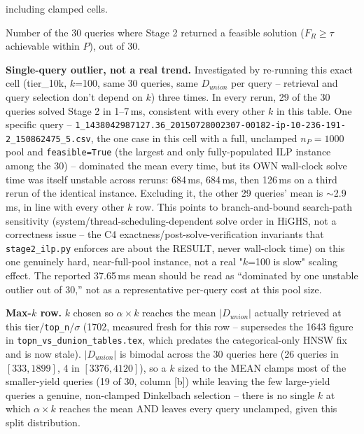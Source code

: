 \begin{table}[t]
\begin{threeparttable}
\begin{tablenotes}
  including clamped cells.
\item[d] Number of the 30 queries where Stage 2 returned a feasible solution ($F_R \geq \tau$
  achievable within $P$), out of 30.
\item[e] \textbf{Single-query outlier, not a real trend.} Investigated by re-running this exact
  cell (tier\_10k, $k$=100, same 30 queries, same $D_{union}$ per query -- retrieval and query
  selection don't depend on $k$) three times. In every rerun, 29 of the 30 queries solved Stage 2
  in 1--7\,ms, consistent with every other $k$ in this table. One specific query --
  \texttt{1\_1438042987127.36\_20150728002307-00182-ip-10-236-191-2\_150862475\_5.csv}, the one
  case in this cell with a full, unclamped $n_P=1000$ pool and \texttt{feasible=True} (the largest
  and only fully-populated ILP instance among the 30) -- dominated the mean every time, but its OWN
  wall-clock solve time was itself unstable across reruns: 684\,ms, 684\,ms, then 126\,ms on a
  third rerun of the identical instance. Excluding it, the other 29 queries' mean is
  $\sim$2.9\,ms, in line with every other $k$ row. This points to branch-and-bound search-path
  sensitivity (system/thread-scheduling-dependent solve order in HiGHS, not a correctness issue --
  the C4 exactness/post-solve-verification invariants that \texttt{stage2\_ilp.py} enforces are
  about the RESULT, never wall-clock time) on this one genuinely hard, near-full-pool instance, not
  a real "$k$=100 is slow" scaling effect. The reported 37.65\,ms mean should be read as
  ``dominated by one unstable outlier out of 30,'' not as a representative per-query cost at this
  pool size.
\item[f] \textbf{Max-$k$ row.} $k$ chosen so $\alpha{\times}k$ reaches the mean $|D_{union}|$
  actually retrieved at this tier/\texttt{top\_n}/$\sigma$ (1702, measured fresh for this row --
  supersedes the 1643 figure in \texttt{topn\_vs\_dunion\_tables.tex}, which predates the
  categorical-only HNSW fix and is now stale). $|D_{union}|$ is bimodal across the 30 queries here
  (26 queries in $[333,1899]$, 4 in $[3376,4120]$), so a $k$ sized to the MEAN clamps most of the
  smaller-yield queries (19 of 30, column [b]) while leaving the few large-yield queries a genuine,
  non-clamped Dinkelbach selection -- there is no single $k$ at which $\alpha{\times}k$ reaches the
  mean AND leaves every query unclamped, given this split distribution.
\end{tablenotes}
\end{threeparttable}
\end{table}

